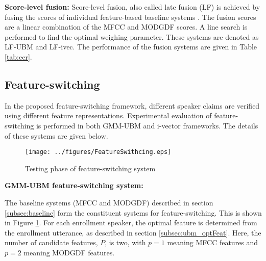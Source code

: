 \documentclass[preprint,12pt,5p]{elsarticle}
\begin{document}
\textbf{Score-level fusion:}  Score-level fusion, also called late fusion (LF)
is achieved by fusing the scores of individual feature-based baseline systems
\cite{fusion}. The fusion scores are a linear combination of the MFCC and MODGDF
scores. A line search is performed to find the optimal weighing parameter. These
systems are denoted as LF-UBM and LF-ivec.  The performance of the fusion
systems are given in Table \ref{tab:eer}. 

	
\subsection{Feature-switching}
\label{subsec:featSwitch}

In the proposed feature-switching framework, different speaker
claims are verified using different feature representations. 
Experimental evaluation of feature-switching is performed in both
GMM-UBM and i-vector frameworks. The details of these systems
are given below.

\begin{figure}[h]
\texttt{[image: ../figures/FeatureSwithcing.eps]}
\caption{Testing phase of feature-switching system}
\label{fig:systemArch2}
\end{figure}


\textbf{GMM-UBM feature-switching system:} 

\hspace{-8mm}
The baseline systems (MFCC and MODGDF) described in section
\ref{subsec:baseline} form the constituent systems for feature-switching. This
is shown in Figure \ref{fig:systemArch2}. For each enrollment speaker, the
optimal feature is determined from the enrollment utterance, as described in
section \ref{subsec:ubm_optFeat}. Here, the number of candidate features, $P$,
is two, with $p=1$ meaning MFCC features and $p=2$ meaning MODGDF features.
\end{document}
